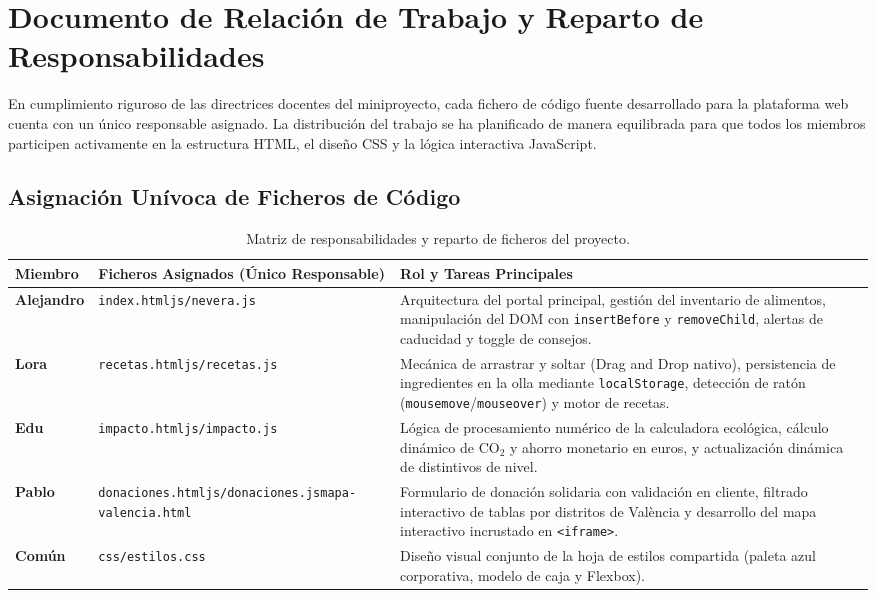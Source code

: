 \documentclass[11pt,a4paper]{article}
\begin{document}
\section{Documento de Relación de Trabajo y Reparto de Responsabilidades}

En cumplimiento riguroso de las directrices docentes del miniproyecto, cada fichero de código fuente desarrollado para la plataforma web cuenta con un único responsable asignado. La distribución del trabajo se ha planificado de manera equilibrada para que todos los miembros participen activamente en la estructura HTML, el diseño CSS y la lógica interactiva JavaScript.

\subsection{Asignación Unívoca de Ficheros de Código}

\begin{table}[h!]
\centering
\small
\begin{tabularx}{\textwidth}{l p{4.5cm} X}
\toprule
\textbf{Miembro} & \textbf{Ficheros Asignados (Único Responsable)} & \textbf{Rol y Tareas Principales} \\
\midrule
\textbf{Alejandro} & \texttt{index.html}\newline \texttt{js/nevera.js} & Arquitectura del portal principal, gestión del inventario de alimentos, manipulación del DOM con \texttt{insertBefore} y \texttt{removeChild}, alertas de caducidad y toggle de consejos. \\
\addlinespace
\textbf{Lora} & \texttt{recetas.html}\newline \texttt{js/recetas.js} & Mecánica de arrastrar y soltar (Drag and Drop nativo), persistencia de ingredientes en la olla mediante \texttt{localStorage}, detección de ratón (\texttt{mousemove}/\texttt{mouseover}) y motor de recetas. \\
\addlinespace
\textbf{Edu} & \texttt{impacto.html}\newline \texttt{js/impacto.js} & Lógica de procesamiento numérico de la calculadora ecológica, cálculo dinámico de CO$_2$ y ahorro monetario en euros, y actualización dinámica de distintivos de nivel. \\
\addlinespace
\textbf{Pablo} & \texttt{donaciones.html}\newline \texttt{js/donaciones.js}\newline \texttt{mapa-valencia.html} & Formulario de donación solidaria con validación en cliente, filtrado interactivo de tablas por distritos de València y desarrollo del mapa interactivo incrustado en \texttt{<iframe>}. \\
\addlinespace
\textbf{Común} & \texttt{css/estilos.css} & Diseño visual conjunto de la hoja de estilos compartida (paleta azul corporativa, modelo de caja y Flexbox). \\
\bottomrule
\end{tabularx}
\caption{Matriz de responsabilidades y reparto de ficheros del proyecto.}
\label{tab:reparto}
\end{table}
\end{document}

